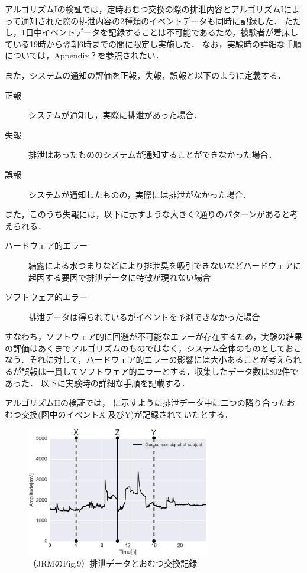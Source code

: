 アルゴリズムIの検証では，定時おむつ交換の際の排泄内容とアルゴリズムIによって通知された際の排泄内容の2種類のイベントデータも同時に記録した．
ただし，1日中イベントデータを記録することは不可能であるため，被験者が着床している19時から翌朝6時までの間に限定し実施した．
なお，実験時の詳細な手順については，Appendix？を参照されたい．

また，システムの通知の評価を正報，失報，誤報と以下のように定義する．

\begin{description}
\item[正報] システムが通知し，実際に排泄があった場合．
\item[失報] 排泄はあったもののシステムが通知することができなかった場合．
\item[誤報] システムが通知したものの，実際には排泄がなかった場合．
\end{description}
\par

また，このうち失報には，以下に示すような大きく2通りのパターンがあると考えられる．

\begin{description}
\item[ハードウェア的エラー] 結露による水つまりなどにより排泄臭を吸引できないなどハードウェアに起因する要因で排泄データに特徴が現れない場合
\item[ソフトウェア的エラー] 排泄データは得られているがイベントを予測できなかった場合
\end{description}
\par

すなわち，ソフトウェア的に回避が不可能なエラーが存在するため，実験の結果の評価はあくまでアルゴリズムのものではなく，システム全体のものとしておこなう．それに対して，ハードウェア的エラーの影響には大小あることが考えられるが誤報は一貫してソフトウェア的エラーとする．収集したデータ数は802件であった．
以下に実験時の詳細な手順を記載する．

アルゴリズムI\hspace{-.1em}Iの検証では，
に示すように排泄データ中に二つの隣り合ったおむつ交換(図中のイベントX 及びY)が記録されていたとする．

\begin{figure}[t]
  \centering
  \includegraphics[width=8cm]{./fig/xyz.eps}
  \caption{（JRMのFig.9）排泄データとおむつ交換記録}
  \label{event}
\end{figure}

